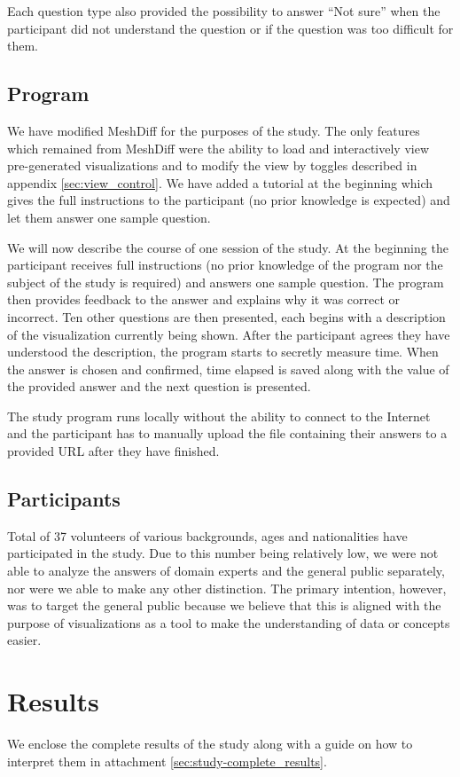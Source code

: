 Each question type also provided the possibility to answer ``Not sure'' when the participant did not understand the question or if the question was too difficult for them.

\subsection{Program}

We have modified MeshDiff for the purposes of the study. The only features which remained from MeshDiff were the ability to load and interactively view pre-generated visualizations and to modify the view by toggles described in appendix \ref{sec:view_control}. We have added a tutorial at the beginning which gives the full instructions to the participant (no prior knowledge is expected) and let them answer one sample question. 

We will now describe the course of one session of the study. At the beginning the participant receives full instructions (no prior knowledge of the program nor the subject of the study is required) and answers one sample question. The program then provides feedback to the answer and explains why it was correct or incorrect. Ten other questions are then presented, each begins with a description of the visualization currently being shown. After the participant agrees they have understood the description, the program starts to secretly measure time. When the answer is chosen and confirmed, time elapsed is saved along with the value of the provided answer and the next question is presented.

The study program runs locally without the ability to connect to the Internet and the participant has to manually upload the file containing their answers to a provided URL after they have finished.

\subsection{Participants}

Total of 37 volunteers of various backgrounds, ages and nationalities have participated in the study. Due to this number being relatively low, we were not able to analyze the answers of domain experts and the general public separately, nor were we able to make any other distinction. The primary intention, however, was to target the general public because we believe that this is aligned with the purpose of visualizations as a tool to make the understanding of data or concepts easier.

\section{Results}

We enclose the complete results of the study along with a guide on how to interpret them in attachment \ref{sec:study-complete_results}.